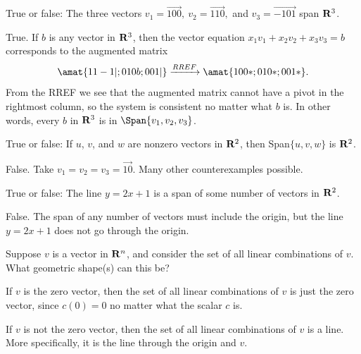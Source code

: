 \begin{problems}
\problem %
True or false: The three vectors
  $v_1 = \vec{1 0 0}, \ v_2 = \vec{1 1 0},$ and $v_3 = \vec{-1 0 1}$
  span ${\bf R}^3$. 

\begin{solution}
True.  If $b$ is any vector in ${\bf R}^3$, then the
vector equation $x_1 v_1 + x_2 v_2 + x_3 v_3 = b$ corresponds to the augmented matrix	
\[\amat{1 1 -1 \vert; 0 1 0 b; 0 0 1 \vert} \xrightarrow[]{RREF}
      \amat{1 0 0 *; 0 1 0 *; 0 0 1 *}.\] 
From the RREF we see that the augmented matrix cannot have a pivot in the rightmost column, so the system is consistent no matter what $b$ is.  In other words, every $b$ in ${\bf R}^3$ is in $\Span\{v_1, v_2, v_3\}$.
\end{solution}

\problem %
True or false: If $u$, $v$, and $w$ are nonzero vectors in ${\bf R}^2$, 
then Span$\{u, v, w\}$ is ${\bf R}^2$. 

\begin{solution}
False.  Take $v_1=v_2=v_3=\vec{1 0}$.  Many other counterexamples 
possible.    
\end{solution}

\problem %
True or false:  
  The line $y = 2x + 1$ is a span of some number of vectors in
  ${\bf R}^2$.

\begin{solution}
False.  The span of any number of vectors must include the origin, but the 
line $y = 2x + 1$ does not go through the origin.    
\end{solution}

\problem %
Suppose $v$ is a vector in ${\bf R}^n$, and consider the set of all linear combinations of $v$.  What geometric shape(s) can this be?

\begin{solution}
If $v$ is the zero vector, then the set of all linear combinations of $v$ is just the zero vector, since $c(0)=0$ no matter what the scalar $c$ is.

If $v$ is not the zero vector, then the set of all linear combinations of $v$ is a line.  More specifically, it is the line through the origin and $v$.
\end{solution}


\end{problems}
